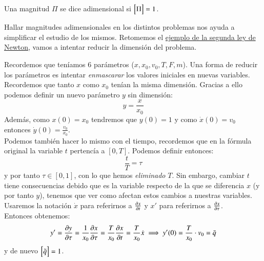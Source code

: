 \begin{dfn}
    Una magnitud $\Pi$ se dice adimensional si $\mx{\Pi} = 1$.
\end{dfn}

Hallar magnitudes adimensionales en los distintos problemas nos ayuda a simplificar el estudio de los mismos. Retomemos el \hyperref[eg:1]{ejemplo de la segunda ley de Newton}, vamos a intentar reducir la dimensión del problema.

\begin{eg}
    Recordemos que teníamos $6$ parámetros ($x, x_0, v_0, T, F, m$). Una forma de reducir los parámetros es intentar \textit{enmascarar} los valores iniciales en nuevas variables.\\ Recordemos que tanto $x$ como $x_0$ tenían la misma dimensión. Gracias a ello podemos definir un nuevo parámetro $y$ sin dimensión:
    $$
        y = \frac{x}{x_0}
    $$
    Además, como $x(0) = x_0$ tendremos que $y(0) = 1$ y como $\dot x(0) = v_0$ entonces $\dot y(0) = \frac{v_0}{x_0}$.\\
    Podemos también hacer lo mismo con el tiempo, recordemos que en la fórmula original la variable $t$ pertencía a $[0, T]$. Podemos definir entonces:
    $$
        \frac{t}{T} = \tau
    $$
    y por tanto $\tau \in [0, 1]$, con lo que hemos \textit{eliminado} $T$. Sin embargo, cambiar $t$ tiene consecuencias debido que es la variable respecto de la que se diferencia $x$ (y por tanto $y$), tenemos que ver como afectan estos cambios a nuestras variables.\\
    Usaremos la notación $\dot x$ para referirnos a $\frac{\partial x}{\partial t}$ y $x'$ para referirnos a $\frac{\partial x}{\partial \tau}$.\\
    Entonces obtenemos:
    $$
        y' = \frac{\partial y}{\partial \tau} = \frac{1}{x_0} \frac{\partial x}{\partial \tau} = \frac{T}{x_0} \frac{\partial x}{\partial t} = \frac{T}{x_0} \dot x \implies y'(0) = \frac{T}{x_0} \cdot v_0 = \tilde q
    $$
    y de nuevo $\mx{\tilde q} = 1$.\\\\


\end{eg}
